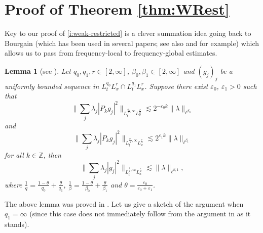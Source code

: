 \documentclass[a4paper]{amsart}
\numberwithin{equation}{section}%
\theoremstyle{plain}%
\newtheorem{lemma}[theorem]{Lemma}
\theoremstyle{definition}
\theoremstyle{remark}%
\begin{document}
\section{Proof of Theorem \ref{thm:WRest}} \label{section:RWT}
Key to our proof of \eqref{i:weak-restricted} is a clever summation idea going back to Bourgain \cite{Bourgain} (which has been used in several papers; see also \cite[Section 6.2]{CSWW} and \cite[Lemma 2.3]{Lee03} for example) which allows us to pass from frequency-local to frequency-global estimates.
\begin{lemma}[see \cite{BHLNS}]\label{l:Bourgain's trick}
Let $q_0, q_1,r \in [2,\infty]$, $\beta_0, \beta_1 \in [2,\infty]$ and $(g_j)_j$ be a uniformly bounded sequence in $L_t^{q_0}L_x^{r}\cap L_t^{q_1}L_x^{r}$. Suppose there exist $\varepsilon_0$, $\varepsilon_1>0$ such that 
\[
\Big\|\sum_j\lambda_j|P_kg_j|^2\Big\|_{L_t^{\frac{q_0}{2},\infty}L_x^{\frac{r}{2}}}\lesssim 2^{-\varepsilon_0k}\|\lambda\|_{\ell^{\beta_0}}
\]
and
\[
\Big\|\sum_j\lambda_j|P_kg_j|^2\Big\|_{L_t^{\frac{q_1}{2}, \infty}L_x^{\frac{r}{2}}}\lesssim 2^{\varepsilon_1k}\|\lambda\|_{\ell^{\beta_1}}
\]
for all $k\in\mathbb{Z}$, then
\[
\Big\|\sum_j\lambda_j|g_j|^2\Big\|_{L_t^{\frac{q}{2},\infty}L_x^{\frac{r}{2}}}\lesssim \|\lambda\|_{\ell^{\beta,1}},
\]
where $\frac{1}{q}=\frac{1-\theta}{q_0}+\frac{\theta}{q_1}$, $\frac{1}{\beta}=\frac{1-\theta}{\beta_0}+\frac{\theta}{\beta_1}$ and $\theta=\frac{\varepsilon_0}{\varepsilon_0+\varepsilon_1}$.
\end{lemma}
The above lemma was proved in \cite[Proposition 2.2]{BHLNS}. Let us give a sketch of the argument when $q_1 = \infty$ (since this case does not immediately follow from the argument in \cite{BHLNS} as it stands).
 
\end{document}
